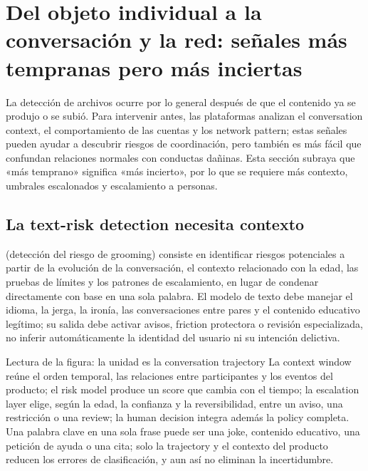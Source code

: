 \section{Del objeto individual a la conversación y la red: señales más tempranas pero más inciertas}

La detección de archivos ocurre por lo general después de que el contenido ya se produjo o se subió. Para intervenir antes, las plataformas analizan el conversation context, el comportamiento de las cuentas y los network pattern; estas señales pueden ayudar a descubrir riesgos de coordinación, pero también es más fácil que confundan relaciones normales con conductas dañinas. Esta sección subraya que «más temprano» significa «más incierto», por lo que se requiere más contexto, umbrales escalonados y escalamiento a personas.

\subsection{La text-risk detection necesita contexto}

 (detección del riesgo de grooming) consiste en identificar riesgos potenciales a partir de la evolución de la conversación, el contexto relacionado con la edad, las pruebas de límites y los patrones de escalamiento, en lugar de condenar directamente con base en una sola palabra. El modelo de texto debe manejar el idioma, la jerga, la ironía, las conversaciones entre pares y el contenido educativo legítimo; su salida debe activar avisos, friction protectora o revisión especializada, no inferir automáticamente la identidad del usuario ni su intención delictiva.


\begin{knowledgebox}{Lectura de la figura: la unidad es la conversation trajectory}
La context window reúne el orden temporal, las relaciones entre participantes y los eventos del producto; el risk model produce un score que cambia con el tiempo; la escalation layer elige, según la edad, la confianza y la reversibilidad, entre un aviso, una restricción o una review; la human decision integra además la policy completa. Una palabra clave en una sola frase puede ser una joke, contenido educativo, una petición de ayuda o una cita; solo la trajectory y el contexto del producto reducen los errores de clasificación, y aun así no eliminan la incertidumbre.
\end{knowledgebox}

